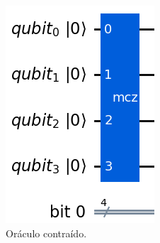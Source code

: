 \begin{figure}[!htb]
    \centering
    \captionsetup{justification=centering}
    \caption{Circuito Quântico Virtual - Oráculo}
    \label{fig: aplicacaoOraculo}

    \begin{subfigure}[b]{0.16\textwidth}
        \centering
        \includegraphics[width=\textwidth]{Imagens/oraculoContraido.png}
        \caption{Oráculo contraído.}
        \label{subfig: oraculoContraido}
    \end{subfigure}
    \hspace{1cm}
    \begin{subfigure}[b]{0.25\textwidth}
        \centering

\end{subfigure}
\end{figure}
